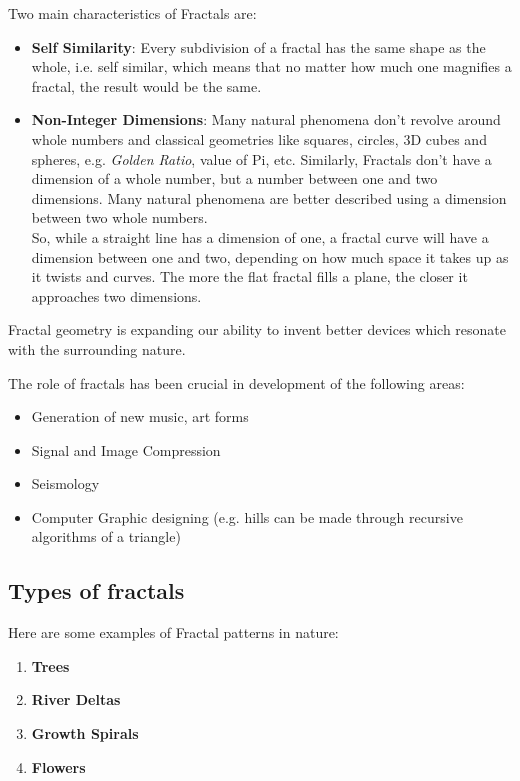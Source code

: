 \documentclass{resonance}
\begin{document}
Two main characteristics of Fractals are:
\begin{itemize}
    \item \textbf{Self Similarity}: Every subdivision of a fractal has the same shape as the whole, i.e. self similar, which means that no matter how much one magnifies a fractal, the result would be the same.
    \item \textbf{Non-Integer Dimensions}: Many natural phenomena don’t revolve around whole numbers and classical geometries like squares, circles, 3D cubes and spheres, e.g. \textit{Golden Ratio}, value of Pi, etc. Similarly, Fractals don’t have a dimension of a whole number, but a number between one and two dimensions. Many natural phenomena are better described using a dimension between two whole numbers.\\

    So, while a straight line has a dimension of one, a fractal curve will have a dimension between one and two, depending on how much space it takes up as it twists and curves. The more the flat fractal fills a plane, the closer it approaches two dimensions.
\end{itemize}

Fractal geometry is expanding our ability to invent better devices which resonate with the surrounding nature.

The role of fractals has been crucial in development of the following areas:
\begin{itemize}
    \item Generation of new music, art forms
    \item Signal and Image Compression
    \item Seismology
    \item Computer Graphic designing (e.g. hills can be made through recursive algorithms of a triangle)
\end{itemize}

\subsection*{Types of fractals}

Here are some examples of Fractal patterns in nature:
\begin{enumerate}
    \item \textbf{Trees}
    \item \textbf{River Deltas}
    \item \textbf{Growth Spirals}
    \item \textbf{Flowers}
\end{enumerate}
\end{document}
